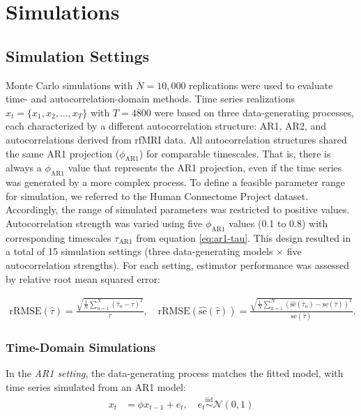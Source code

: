 \documentclass[latex/main.tex]{subfiles}
\begin{document}
\section{Simulations}\label{sec:simulations}

\subsection{Simulation Settings}
Monte Carlo simulations with $N = 10,000$ replications were used to evaluate time- and autocorrelation-domain methods. Time series realizations $x_t = \{x_1, x_2, ..., x_T\}$ with $T=4800$ were based on three data-generating processes, each characterized by a different autocorrelation structure: AR1, AR2, and autocorrelations derived from rfMRI data. All autocorrelation structures shared the same AR1 projection ($\phi_\text{AR1}$) for comparable timescales. That is, there is always a $\phi_\text{AR1}$ value that represents the AR1 projection, even if the time series was generated by a more complex process. To define a feasible parameter range for simulation, we referred to the Human Connectome Project dataset. Accordingly, the range of simulated parameters was restricted to positive values. Autocorrelation strength was varied using five $\phi_\text{AR1}$ values (0.1 to 0.8) with corresponding timescales $\tau_\text{AR1}$ from equation \eqref{eq:ar1-tau}. This design resulted in a total of 15 simulation settings (three data-generating models $\times$ five autocorrelation strengths). For each setting, estimator performance was assessed by relative root mean squared error: 

\begin{align}
    \text{rRMSE}(\hat\tau) = \frac{\sqrt{\frac{1}{N} \sum_{n=1}^N (\hat\tau_n - \tau)^2}}{\tau}, \quad \text{rRMSE}(\widehat{\text{se}}(\hat\tau)) = \frac{\sqrt{\frac{1}{N} \sum_{n=1}^N \left(\widehat{\text{se}}(\hat\tau_n) - \text{se}(\hat\tau)\right)^2}}{\text{se}(\hat\tau)}.
\end{align}

\subsubsection{Time-Domain Simulations}
In the \textit{AR1 setting}, the data-generating process matches the fitted model, with time series simulated from an AR1 model:
\begin{align}
    x_t &= \phi x_{t-1} + e_t, \quad e_t \overset{\text{iid}}{\sim} \mathcal{N}(0, 1)
\end{align}
\end{document}
